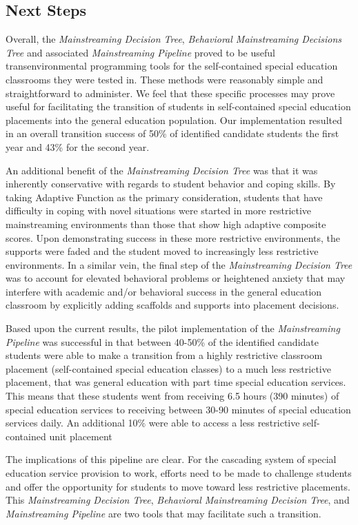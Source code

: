 \documentclass[twoside]{article}
\begin{document}
\subsection{Next Steps}
Overall, the \textit{Mainstreaming Decision Tree}, \textit{Behavioral Mainstreaming Decisions Tree} and associated \textit{Mainstreaming Pipeline} proved to be useful transenvironmental programming tools for the self-contained special education classrooms they were tested in. These methods were reasonably simple and straightforward to administer. We feel that these specific processes may prove useful for facilitating the transition of students in self-contained special education placements into the general education population. Our implementation resulted in an overall transition success of 50\% of identified candidate students the first year and 43\% for the second year. 

An additional benefit of the \textit{Mainstreaming Decision Tree} was that it was inherently conservative with regards to student behavior and coping skills. By taking Adaptive Function as the primary consideration, students that have difficulty in coping with novel situations were started in more restrictive mainstreaming environments than those that show high adaptive composite scores. Upon demonstrating success in these more restrictive environments, the supports were faded and the student moved to increasingly less restrictive environments. In a similar vein, the final step of the \textit{Mainstreaming Decision Tree} was to account for elevated behavioral problems or heightened anxiety that may interfere with academic and/or behavioral success in the general education classroom by explicitly adding scaffolds and supports into placement decisions.

Based upon the current results, the pilot implementation of the \textit{Mainstreaming Pipeline} was successful in that between 40-50\% of the identified candidate students were able to make a transition from a highly restrictive classroom placement (self-contained special education classes) to a much less restrictive placement, that was general education with part time special education services. This means that these students went from receiving 6.5 hours (390 minutes) of special education services to receiving between 30-90 minutes of special education services daily. An additional 10\% were able to access a less restrictive self-contained unit placement 

The implications of this pipeline are clear. For the cascading system of special education service provision to work, efforts need to be made to challenge students and offer the opportunity for students to move toward less restrictive placements. This \textit{Mainstreaming Decision Tree}, \textit{Behavioral Mainstreaming Decision Tree}, and \textit{Mainstreaming Pipeline} are two tools that may facilitate such a transition. 
\end{document}
